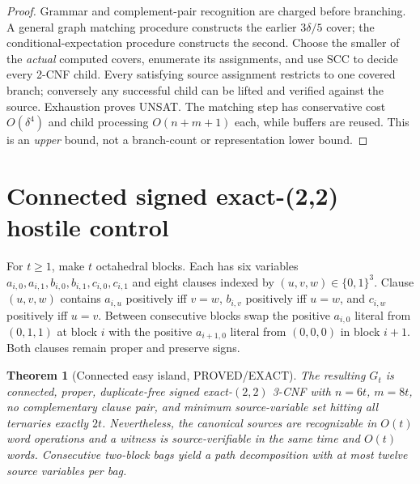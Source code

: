 \documentclass[11pt]{article}
\newtheorem{theorem}{Theorem}
\begin{document}
\begin{proof}
Grammar and complement-pair recognition are charged before branching. A general graph matching procedure constructs the earlier $3\delta/5$ cover; the conditional-expectation procedure constructs the second. Choose the smaller of the \emph{actual} computed covers, enumerate its assignments, and use SCC to decide every 2-CNF child. Every satisfying source assignment restricts to one covered branch; conversely any successful child can be lifted and verified against the source. Exhaustion proves UNSAT. The matching step has conservative cost $O(\delta^4)$ and child processing $O(n+m+1)$ each, while buffers are reused. This is an \emph{upper} bound, not a branch-count or representation lower bound.
\end{proof}

\section{Connected signed exact-(2,2) hostile control}
For $t\ge1$, make $t$ octahedral blocks. Each has six variables
$a_{i,0},a_{i,1},b_{i,0},b_{i,1},c_{i,0},c_{i,1}$
and eight clauses indexed by $(u,v,w)\in\{0,1\}^3$. Clause $(u,v,w)$ contains $a_{i,u}$ positively iff $v=w$, $b_{i,v}$ positively iff $u=w$, and $c_{i,w}$ positively iff $u=v$. Between consecutive blocks swap the positive $a_{i,0}$ literal from $(0,1,1)$ at block $i$ with the positive $a_{i+1,0}$ literal from $(0,0,0)$ in block $i+1$. Both clauses remain proper and preserve signs.
\begin{theorem}[Connected easy island, PROVED/EXACT]
The resulting $G_t$ is connected, proper, duplicate-free signed exact-$(2,2)$ 3-CNF with $n=6t$, $m=8t$, no complementary clause pair, and minimum source-variable set hitting all ternaries exactly $2t$. Nevertheless, the canonical sources are recognizable in $O(t)$ word operations and a witness is source-verifiable in the same time and $O(t)$ words. Consecutive two-block bags yield a path decomposition with at most twelve source variables per bag.
\end{theorem}
\end{document}
